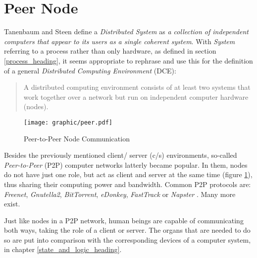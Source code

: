 %
%
%
%
%
%
%

\section{Peer Node}
\label{peer_node_heading}

Tanenbaum and Steen \cite{tanenbaum2002} define a \emph{Distributed System} as
\textit{a collection of independent computers that appear to its users as a
single coherent system}. With \emph{System} referring to a process rather than
only hardware, as defined in section \ref{process_heading}, it seems appropriate
to rephrase and use this for the definition of a general
\emph{Distributed Computing Environment} (DCE):

\begin{quote}
    A distributed computing environment consists of at least two systems that
    work together over a network but run on independent computer hardware (nodes).
\end{quote}

\begin{figure}[ht]
    \begin{center}
        \texttt{[image: graphic/peer.pdf]}
        \caption{Peer-to-Peer Node Communication}
        \label{peer_figure}
    \end{center}
\end{figure}

Besides the previously mentioned client/ server (c/s) environments, so-called
\emph{Peer-to-Peer} (P2P) computer networks latterly became popular. In them,
nodes do not have just one role, but act as client and server at the same time
(figure \ref{peer_figure}), thus sharing their computing power and bandwidth.
Common P2P protocols are: \emph{Freenet}, \emph{Gnutella2}, \emph{BitTorrent},
\emph{eDonkey}, \emph{FastTrack} or \emph{Napster} \cite{wikipedia}. Many more
exist.

Just like nodes in a P2P network, human beings are capable of communicating
both ways, taking the role of a client or server. The organs that are needed to
do so are put into comparison with the corresponding devices of a computer
system, in chapter \ref{state_and_logic_heading}.
